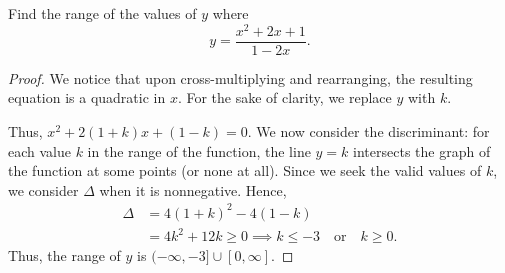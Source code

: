 \documentclass[../jarvis.tex]{subfiles}
\begin{document}
\begin{example}[Textbook]
    Find the range of the values of $y$ where $$y=\frac{x^2+2x+1}{1-2x}.$$
\end{example}
\begin{proof}
    We notice that upon cross-multiplying and rearranging, the resulting equation is a quadratic in $x$. For the sake of clarity, we replace $y$ with $k$.

    Thus, $x^2+2(1+k)x+(1-k)=0$. We now consider the discriminant: for each value $k$ in the range of the function, the line $y=k$ intersects the graph of the function at some points (or none at all). Since we seek the valid values of $k$, we consider $\Delta$ when it is nonnegative. Hence, \begin{align*}
         \Delta&=4(1+k)^2-4(1-k)\\
                &=4k^2+12k\geq 0 \implies k\leq-3\quad\text{or}\quad k\geq 0. 
    \end{align*}
    Thus, the range of $y$ is $\boxed{(-\infty,-3]\cup[0,\infty]}$.
\end{proof}
\end{document}
